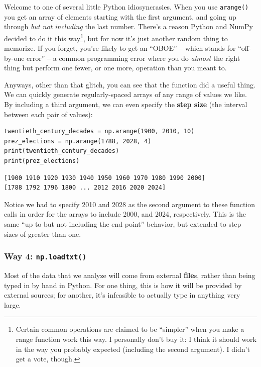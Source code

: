 Welcome to one of several little Python idiosyncrasies. When you use
\texttt{arange()} you get an array of elements starting with the first
argument, and going up through \textit{but not including} the last number.
There's a reason Python and NumPy decided to do it this way\footnote{Certain
common operations are claimed to be ``simpler'' when you make a range function
work this way. I personally don't buy it: I think it should work in the way you
probably expected (including the second argument). I didn't get a vote,
though.}, but for now it's just another random thing to memorize. If you
forget, you're likely to get an ``OBOE'' -- which stands for ``off-by-one
error'' -- a common programming error where you do \textit{almost} the right
thing but perform one fewer, or one more, operation than you meant to.

Anyways, other than that glitch, you can see that the function did a useful
thing. We can quickly generate regularly-spaced arrays of any range of values
we like. By including a third argument, we can even specify the \textbf{step
size} (the interval between each pair of values):

\begin{Verbatim}[fontsize=\small,samepage=true,frame=single,framesep=3mm]
twentieth_century_decades = np.arange(1900, 2010, 10)
prez_elections = np.arange(1788, 2028, 4)
print(twentieth_century_decades)
print(prez_elections)
\end{Verbatim}

\begin{Verbatim}[fontsize=\small,samepage=true,frame=leftline,framesep=5mm,framerule=1mm]
[1900 1910 1920 1930 1940 1950 1960 1970 1980 1990 2000]
[1788 1792 1796 1800 ... 2012 2016 2020 2024]
\end{Verbatim}

Notice we had to specify 2010 and 2028 as the second argument to these function
calls in order for the arrays to include 2000, and 2024, respectively. This is
the same ``up to but not including the end point'' behavior, but extended to
step sizes of greater than one.

\subsubsection{Way 4: \texttt{np.loadtxt()}}
\label{np.loadtxt}


Most of the data that we analyze will come from external \textbf{file}s, rather
than being typed in by hand in Python. For one thing, this is how it will be
provided by external sources; for another, it's infeasible to actually type in
anything very large.

